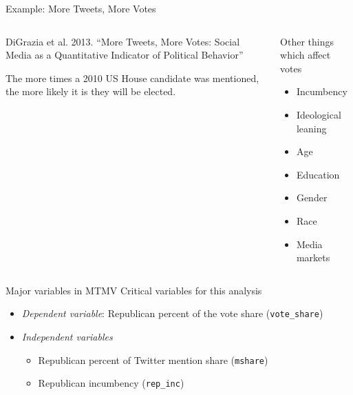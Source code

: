 \documentclass{beamer}
\begin{document}
\begin{frame}{Example: More Tweets, More Votes}
    \begin{columns}
        \begin{column}{0.5\textwidth}
            DiGrazia et al. 2013. ``More Tweets, More Votes: Social Media as a Quantitative Indicator of Political Behavior''

            \vspace*{1em}

            The more times a 2010 US House candidate was mentioned, the more likely it is they will be elected.
        \end{column}
        \begin{column}{0.5\textwidth}
            Other things which affect votes
            \begin{itemize}
                \item Incumbency
                \item Ideological leaning
                \item Age
                \item Education
                \item Gender
                \item Race
                \item Media markets
            \end{itemize}
        \end{column}
    \end{columns}
\end{frame}

\begin{frame}{Major variables in MTMV}
    Critical variables for this analysis
    \begin{itemize}[<+->]
        \item \textit{Dependent variable}: Republican percent of the vote share (\texttt{vote\_share})
        \item \textit{Independent variables}
        \begin{itemize}
            \item Republican percent of Twitter mention share (\texttt{mshare})
            \item Republican incumbency (\texttt{rep\_inc})
        \end{itemize}
    \end{itemize}
\end{frame}
\end{document}
